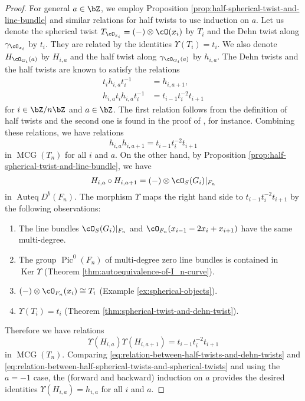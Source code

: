 \documentclass{amsart}
\numberwithin{equation}{section}
\theoremstyle{plain}
\theoremstyle{definition}
\DeclareMathOperator{\Auteq}{\mathrm{Auteq}}
\DeclareMathOperator{\Pic}{\mathrm{Pic}}
\DeclareMathOperator{\MCG}{\mathrm{MCG}}
\DeclareMathOperator{\Ker}{\mathrm{Ker}}
\begin{document}
\begin{proof}
    For general $a \in \bZ$, we employ Proposition \ref{prop:half-spherical-twist-and-line-bundle} and similar relations for half twists to use induction on $a$.
    Let us denote the spherical twist $T_{\cO_{x_i}} = (-)\otimes \cO(x_i)$ by $T_i$ and the Dehn twist along $\gamma_{\cO_{x_i}}$ by $t_i$.
    They are related by the identities $\Upsilon(T_i) = t_i$.
    We also denote $H_{\cO_{G_i}(a)}$ by $H_{i, a}$ and the half twist along $\gamma_{\cO_{G_i}(a)}$ by $h_{i, a}$.
    The Dehn twists and the half twists are known to satisfy the relations
    \begin{align}
        t_i h_{i, a} t_i^{-1}          & = h_{i, a+1},            \\
        h_{i, a} t_i h_{i, a} t_i^{-1} & = t_{i-1}t_i^{-2}t_{i+1}
    \end{align}
    for $i \in \bZ/n\bZ$ and $a \in \bZ$.
    The first relation follows from the definition of half twists and the second one is found in the proof of \cite[Corollary 2.11]{MR1805936}, for instance.
    Combining these relations, we have relations
    \begin{equation}\label{eq:relation-between-half-twists-and-dehn-twists}
        h_{i, a}h_{i, a+1} = t_{i-1}t_i^{-2}t_{i+1}
    \end{equation}
    in $\MCG(T_n)$ for all $i$ and $a$.
    On the other hand, by Proposition \ref{prop:half-spherical-twist-and-line-bundle}, we have
    \begin{equation}
        H_{i, a}\circ H_{i, a+1} = (-)\otimes \cO_S(G_i)\lvert_{F_n}
    \end{equation}
    in $\Auteq D^b(F_n)$.
    The morphism $\Upsilon$ maps the right hand side to $t_{i-1}t_i^{-2}t_{i+1}$ by the following observations:
    \begin{enumerate}
        \item The line bundles $\cO_S(G_i)\lvert_{F_n}$ and $\cO_{F_n}(x_{i-1}-2x_{i}+x_{i+1})$ have the same multi-degree.
        \item The group $\Pic^0(F_n)$ of multi-degree zero line bundles is contained in $\Ker \Upsilon$ (Theorem \ref{thm:autoequivalence-of-I_n-curve}).
        \item $(-) \otimes \cO_{F_n}(x_i) \cong T_i$ (Example \ref{ex:spherical-objects}).
        \item $\Upsilon(T_i) = t_i$ (Theorem \ref{thm:spherical-twist-and-dehn-twist}).
    \end{enumerate}
    Therefore we have relations
    \begin{equation}\label{eq:relation-between-half-spherical-twists-and-spherical-twists}
        \Upsilon(H_{i, a})\Upsilon(H_{i, a+1}) = t_{i-1}t_i^{-2}t_{i+1}
    \end{equation}
    in $\MCG(T_n)$.
    Comparing \eqref{eq:relation-between-half-twists-and-dehn-twists} and \eqref{eq:relation-between-half-spherical-twists-and-spherical-twists} and using the $a = -1$ case, the (forward and backward) induction on $a$ provides the desired identities $\Upsilon(H_{i, a}) = h_{i, a}$ for all $i$ and $a$.
\end{proof}
\end{document}
